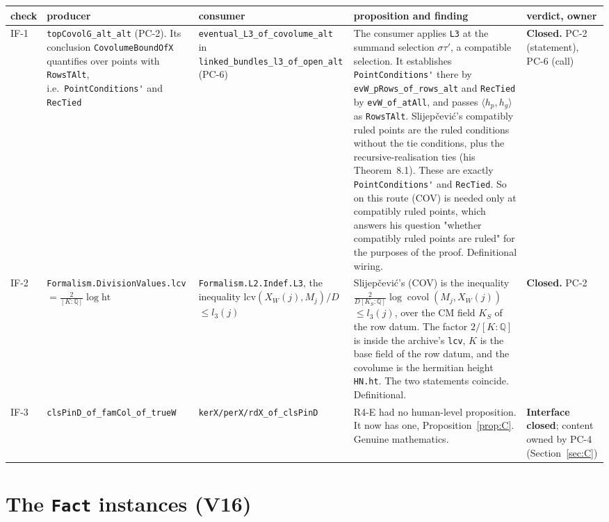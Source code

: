 \documentclass[11pt]{article}
\newcommand{\lean}[1]{\nolinkurl{#1}}
\newcommand{\PC}[1]{PC-#1}
\theoremstyle{remark}
\begin{document}
\begin{center}\small
\begin{tabularx}{\textwidth}{>{\raggedright}p{0.9cm}>{\raggedright}p{2.6cm}>{\raggedright}p{2.5cm}>{\raggedright}X>{\raggedright\arraybackslash}p{1.8cm}}
\toprule
check & producer & consumer & proposition and finding & verdict, owner\\
\midrule
IF-1 & \lean{topCovolG_alt_alt} (\PC{2}). Its conclusion \lean{CovolumeBoundOfX} quantifies over points with \lean{RowsTAlt}, i.e.\ \lean{PointConditions'} and \lean{RecTied} & \lean{eventual_L3_of_covolume_alt} in \lean{linked_bundles_l3_of_open_alt} (\PC{6}) & The consumer applies \lean{L3} at the summand selection $\sigma\tau'$, a compatible selection. It establishes \lean{PointConditions'} there by \lean{evW_pRows_of_rows_alt} and \lean{RecTied} by \lean{evW_of_atAll}, and passes $\langle h_p,h_g\rangle$ as \lean{RowsTAlt}. Slijepčević's compatibly ruled points are the ruled conditions without the tie conditions, plus the recursive-realisation ties (his Theorem~8.1). These are exactly \lean{PointConditions'} and \lean{RecTied}. So on this route (COV) is needed only at compatibly ruled points, which answers his question "whether compatibly ruled points are ruled" for the purposes of the proof. Definitional wiring. & \textbf{Closed.} \PC{2} (statement), \PC{6} (call)\\
IF-2 & \lean{Formalism.DivisionValues.lcv} $=\frac{2}{[K:\mathbb Q]}\log\mathrm{ht}$ & \lean{Formalism.L2.Indef.L3}, the inequality $\mathrm{lcv}(X_W(j),M_j)/D$ $\le l_3(j)$ & Slijepčević's (COV) is the inequality $\tfrac{2}{D[K_S:\mathbb Q]}\log\operatorname{covol}(M_j,X_W(j))$ $\le l_3(j)$, over the CM field $K_S$ of the row datum. The factor $2/[K:\mathbb Q]$ is inside the archive's \lean{lcv}, $K$ is the base field of the row datum, and the covolume is the hermitian height \lean{HN.ht}. The two statements coincide. Definitional. & \textbf{Closed.} \PC{2}\\
IF-3 & \lean{clsPinD_of_famCol_of_trueW} & \lean{kerX/perX/rdX_of_clsPinD} & R4-E had no human-level proposition. It now has one, Proposition~\ref{prop:C}. Genuine mathematics. & \textbf{Interface closed}; content owned by \PC{4} (Section~\ref{sec:C})\\
\bottomrule
\end{tabularx}
\end{center}

\section{The \texorpdfstring{\lean{Fact}}{Fact} instances (V16)}\label{sec:facts}
\end{document}
